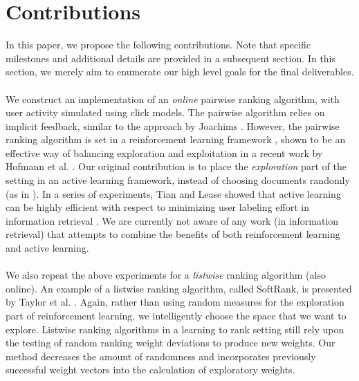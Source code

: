 \documentclass{acm_proc_article-sp}
\begin{document}
\section{Contributions}
In this paper, we propose the following contributions. Note that specific milestones and additional details are provided in a subsequent section. In this section, we merely aim to enumerate our high level goals for the final deliverables.\\ \\
We construct an implementation of an \emph{online} pairwise ranking algorithm, with user activity simulated using click models. The pairwise algorithm relies on implicit feedback, similar to the approach by Joachims \cite{joachims}. However, the pairwise ranking algorithm is set in a reinforcement learning framework \cite{rl}, shown to be an effective way of balancing exploration and exploitation in a recent work by Hofmann et al. \cite{hofmann}. Our original contribution is to place the \emph{exploration} part of the setting in an active learning framework, instead of choosing documents randomly (as in \cite{hofmann}). In a series of experiments, Tian and Lease showed that active learning can be highly efficient with respect to minimizing user labeling effort in information retrieval \cite{aibo}. We are currently not aware of any work (in information retrieval) that attempts to combine the benefits of both reinforcement learning and active learning. \\ \\
We also repeat the above experiments for a \emph{listwise} ranking algorithm (also online). An example of a listwise ranking algorithm, called SoftRank, is presented by Taylor et al. \cite{taylor}. Again, rather than using random measures for the exploration part of reinforcement learning, we intelligently choose the space that we want to explore.  Listwise ranking algorithms in a learning to rank setting still rely upon the testing of random ranking weight deviations to produce new weights.  Our method decreases the amount of randomness and incorporates previously successful weight vectors into the calculation of exploratory weights.\\ \\
\end{document}
